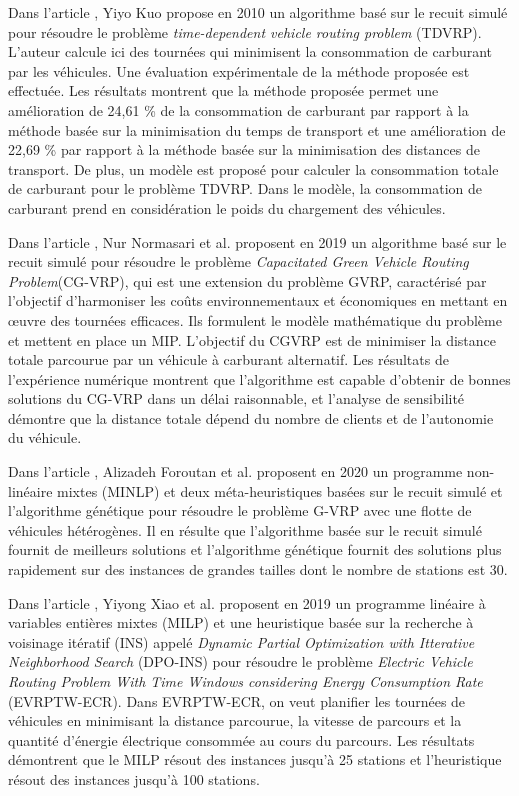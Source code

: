 Dans l'article \cite{article_GVRP13}, Yiyo Kuo propose en 2010 un algorithme basé sur le recuit simulé pour résoudre le problème \textit{time-dependent vehicle routing problem}
(TDVRP). L'auteur calcule ici des tournées qui minimisent la consommation de carburant par les véhicules. Une évaluation expérimentale de la méthode proposée est effectuée. Les résultats montrent que la méthode proposée permet une amélioration de 24,61 \% de la consommation de carburant par rapport à la méthode basée sur la minimisation du temps de transport et une amélioration de 22,69 \% par rapport à la méthode basée sur la minimisation des distances de transport. De plus, un modèle est proposé pour calculer la consommation totale de carburant pour le problème TDVRP. Dans le modèle, la consommation de carburant prend en considération le poids du chargement des véhicules.


Dans l'article \cite{article_GVRP14}, Nur Normasari et al. proposent en 2019 un algorithme basé sur le recuit simulé pour résoudre le problème \textit{Capacitated Green Vehicle Routing Problem}(CG-VRP), qui est une extension du problème GVRP, caractérisé par l'objectif d'harmoniser les coûts environnementaux et économiques en mettant en œuvre des tournées efficaces. Ils formulent le modèle mathématique du problème et mettent en place un MIP. L'objectif du CGVRP est de minimiser la distance totale parcourue par un véhicule à carburant alternatif. Les résultats de l'expérience numérique montrent que l'algorithme est capable d'obtenir de bonnes solutions du CG-VRP dans un délai raisonnable, et l'analyse de sensibilité démontre que la distance totale dépend du nombre de clients et de l'autonomie du véhicule.

Dans l'article \cite{Alizadeh_Foroutan_2020}, Alizadeh Foroutan et al. proposent en 2020 un programme non-linéaire mixtes (MINLP) et deux méta-heuristiques basées sur le recuit simulé et l'algorithme génétique pour résoudre le problème G-VRP avec une flotte de véhicules hétérogènes. Il en résulte que l'algorithme basée sur le recuit simulé fournit de meilleurs solutions et l'algorithme génétique fournit des solutions plus rapidement sur des instances de grandes tailles dont le nombre de stations est 30.

Dans l'article \cite{article_GVRP15}, Yiyong Xiao et al. proposent en 2019 un programme linéaire à variables entières mixtes (MILP) et une heuristique basée sur la recherche à voisinage itératif (INS) appelé \textit{Dynamic Partial Optimization with Itterative Neighborhood Search} (DPO-INS) pour résoudre le problème \textit{Electric Vehicle Routing Problem With Time Windows considering Energy Consumption Rate} (EVRPTW-ECR). Dans EVRPTW-ECR, on veut planifier les tournées de véhicules en minimisant la distance parcourue, la vitesse de parcours et la quantité d'énergie électrique consommée au cours du parcours.
Les résultats démontrent que le MILP résout des instances jusqu'à 25 stations et l'heuristique résout des instances jusqu'à 100 stations.

